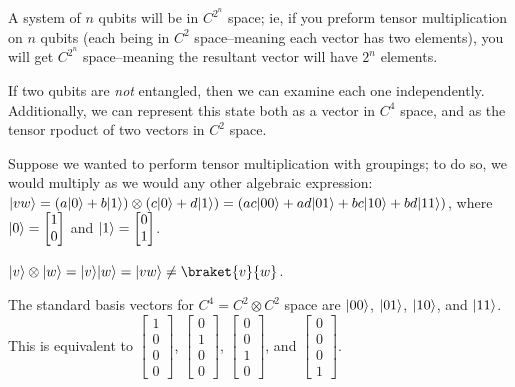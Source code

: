 
\begin{note}
    A system of $n$ qubits will be in $C^{2^n}$ space; ie, if you preform tensor multiplication on $n$ qubits (each being in $C^2$ space–meaning each vector has two elements), you will get $C^{2^n}$ space–meaning the resultant vector will have $2^n$ elements.
\end{note}

\begin{note}
    If two qubits are \emph{not} entangled, then we can examine each one independently. Additionally, we can represent this state both as a vector in $C^4$ space, and as the tensor rpoduct of two vectors in $C^2$ space.
\end{note}

Suppose we wanted to perform tensor multiplication with groupings; to do so, we would multiply as we would any other algebraic expression: $\lvert vw\rangle = (a \lvert0\rangle + b \lvert1\rangle) \otimes (c \lvert0\rangle + d \lvert1\rangle) = (ac \lvert00\rangle + ad \lvert01\rangle + bc \lvert10\rangle + bd \lvert11\rangle)$, where $\lvert0\rangle = \begin{bmatrix}
    1\\
    0
\end{bmatrix}$ and $\lvert1\rangle = \begin{bmatrix}
    0\\
    1
\end{bmatrix}$.

\begin{note}
    $\ket{v} \otimes \ket{w} = \ket{v} \ket{w} = \ket{vw} \neq \braket{v}{w}$.
\end{note}

The standard basis vectors for $C^4 = C^2 \otimes C^2$ space are $\lvert00\rangle$, $\lvert01\rangle$, $\lvert10\rangle$, and $\lvert11\rangle$. This is equivalent to $\begin{bmatrix}
    1\\
    0\\
    0\\
    0
\end{bmatrix}$, $\begin{bmatrix}
    0\\
    1\\
    0\\
    0
\end{bmatrix}$, $\begin{bmatrix}
    0\\
    0\\
    1\\
    0
\end{bmatrix}$, and $\begin{bmatrix}
    0\\
    0\\
    0\\
    1
\end{bmatrix}$.

